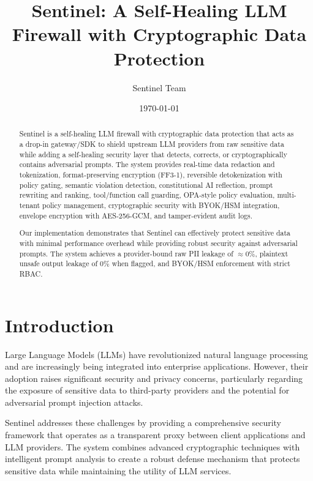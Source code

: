 \documentclass[12pt]{article}
\title{Sentinel: A Self-Healing LLM Firewall with Cryptographic Data Protection}
\author{Sentinel Team}
\date{\today}
\begin{document}
\maketitle
\thispagestyle{fancy}

\begin{abstract}
Sentinel is a self-healing LLM firewall with cryptographic data protection that acts as a drop-in gateway/SDK to shield upstream LLM providers from raw sensitive data while adding a self-healing security layer that detects, corrects, or cryptographically contains adversarial prompts. The system provides real-time data redaction and tokenization, format-preserving encryption (FF3-1), reversible detokenization with policy gating, semantic violation detection, constitutional AI reflection, prompt rewriting and ranking, tool/function call guarding, OPA-style policy evaluation, multi-tenant policy management, cryptographic security with BYOK/HSM integration, envelope encryption with AES-256-GCM, and tamper-evident audit logs. 

Our implementation demonstrates that Sentinel can effectively protect sensitive data with minimal performance overhead while providing robust security against adversarial prompts. The system achieves a provider-bound raw PII leakage of $\approx 0\%$, plaintext unsafe output leakage of $0\%$ when flagged, and BYOK/HSM enforcement with strict RBAC.
\end{abstract}

\tableofcontents
\newpage

\section{Introduction}

Large Language Models (LLMs) have revolutionized natural language processing and are increasingly being integrated into enterprise applications. However, their adoption raises significant security and privacy concerns, particularly regarding the exposure of sensitive data to third-party providers and the potential for adversarial prompt injection attacks.

Sentinel addresses these challenges by providing a comprehensive security framework that operates as a transparent proxy between client applications and LLM providers. The system combines advanced cryptographic techniques with intelligent prompt analysis to create a robust defense mechanism that protects sensitive data while maintaining the utility of LLM services.
\end{document}
